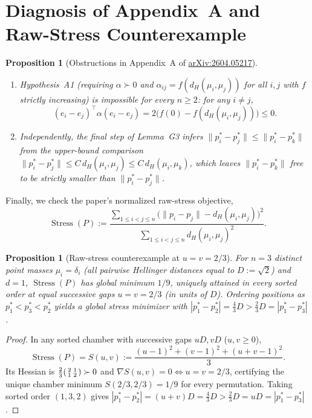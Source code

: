 \documentclass[11pt]{article}
\theoremstyle{plain}
\newtheorem{proposition}[theorem]{Proposition}
\theoremstyle{definition}
\theoremstyle{remark}
\DeclareMathOperator{\Stress}{Stress}
\begin{document}
\section{Diagnosis of Appendix~A and Raw-Stress Counterexample}

\begin{proposition}[Obstructions in Appendix~A of \href{https://arxiv.org/abs/2604.05217}{arXiv:2604.05217}]\label{prop:appA}
\leavevmode
\begin{enumerate}[label=\textup{(\arabic*)},leftmargin=2em,itemsep=2pt]
\item Hypothesis~\textup{A1} (requiring $\alpha \succ 0$ and $\alpha_{ij} = f(d_H(\mu_i, \mu_j))$ for all $i, j$ with $f$ strictly increasing) is impossible for every $n \ge 2$: for any $i \neq j$,
\[
(e_i - e_j)^\top \alpha (e_i - e_j) = 2\bigl(f(0) - f(d_H(\mu_i, \mu_j))\bigr) \le 0.
\]
\item Independently, the final step of Lemma~\textup{G3} infers $\|p_i^* - p_j^*\| \le \|p_i^* - p_k^*\|$ from the upper-bound comparison $\|p_i^* - p_j^*\| \le C\,d_H(\mu_i, \mu_j) \le C\,d_H(\mu_i, \mu_k)$, which leaves $\|p_i^* - p_k^*\|$ free to be strictly smaller than $\|p_i^* - p_j^*\|$.
\end{enumerate}
\end{proposition}

Finally, we check the paper's normalized raw-stress objective,
\[
\Stress(P) := \frac{\sum_{1 \le i < j \le n}\bigl(\|p_i - p_j\| - d_H(\mu_i, \mu_j)\bigr)^2}{\sum_{1 \le i < j \le n} d_H(\mu_i, \mu_j)^2}.
\]

\begin{proposition}[Raw-stress counterexample at $u = v = 2/3$]\label{prop:stress}
For $n = 3$ distinct point masses $\mu_i = \delta_i$ (all pairwise Hellinger distances equal to $D := \sqrt{2}$) and $d = 1$, $\Stress(P)$ has global minimum $1/9$, uniquely attained in every sorted order at equal successive gaps $u = v = 2/3$ (in units of $D$). Ordering positions as $p_1^* < p_3^* < p_2^*$ yields a global stress minimizer with $|p_1^* - p_2^*| = \frac{4}{3}D > \frac{2}{3}D = |p_1^* - p_3^*|$.
\end{proposition}

\begin{proof}
In any sorted chamber with successive gaps $uD, vD$ ($u, v \ge 0$),
\[
\Stress(P) = S(u, v) := \frac{(u - 1)^2 + (v - 1)^2 + (u + v - 1)^2}{3}.
\]
Its Hessian is $\frac{2}{3}\begin{psmallmatrix}2 & 1 \\ 1 & 2\end{psmallmatrix} \succ 0$ and $\nabla S(u, v) = 0 \iff u = v = 2/3$, certifying the unique chamber minimum $S(2/3, 2/3) = 1/9$ for every permutation. Taking sorted order $(1, 3, 2)$ gives $|p_1^* - p_2^*| = (u + v)D = \frac{4}{3}D > \frac{2}{3}D = uD = |p_1^* - p_3^*|$.
\end{proof}
\end{document}
